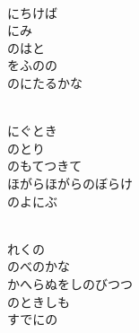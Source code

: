 \documentclass[10pt,b5j]{tarticle} %
\begin{document}
\begin{enumerate}
\begin{minipage}[c]{\blocksize}
    \end{minipage}
    \begin{minipage}[c]{\blocksize}
        
        \vspace{\linespace}
        \item~\\
        にちけば\\
        にみ\\
        のはと\\
        をふのの\\
        のにたるかな
        
    \end{minipage}
    \begin{minipage}[c]{\blocksize}
        
        \vspace{\linespace}
        \item~\\
        にぐとき\\
        のとり\\
        のもてつきて\\
        ほがらほがらのぼらけ\\
        のよにぶ
        
    \end{minipage}
    \begin{minipage}[c]{\blocksize}
        
        \vspace{\linespace}
        \item~\\
        れくの\\
        のべのかな\\
        かへらぬをしのびつつ\\
        のときしも\\
        すでにの
    
    \end{minipage}
\end{enumerate} %
\end{document}
